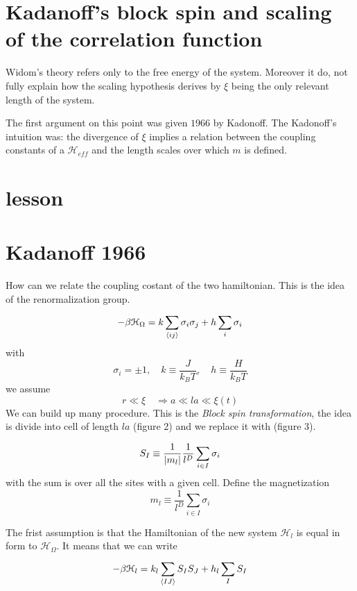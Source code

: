 \documentclass[../main/main.tex]{subfiles}
\begin{document}
\section{Kadanoff's block spin and scaling of the correlation function}
Widom's theory refers only to the free energy of the system. Moreover it do, not fully explain how the scaling hypothesis derives by \( \xi  \) being the only relevant length of the system.

The first argument on this point was given \( 1966 \) by Kadonoff.
The Kadonoff's intuition was: the divergence of \( \xi  \) implies a relation between the coupling constants of a \( \mathcal{H}_{eff} \) and the length scales over which \( m \) is defined.  


\section{lesson}

\section{Kadanoff 1966}
How can we relate the coupling costant of the two hamiltonian. This is the idea of the renormalization group.
\begin{equation}
  - \beta \mathcal{H}_{\Omega } = k \sum_{\expval{ij} }^{} \sigma _i \sigma _j + h \sum_{i}^{} \sigma _i
\end{equation}
with
\begin{equation}
  \sigma _i = \pm 1, \quad k \equiv \frac{J}{k_B T}, \quad h \equiv \frac{H}{k_B T}
\end{equation}
we assume
\begin{equation}
  r \ll \xi  \quad \Rightarrow a \ll l a \ll \xi (t)
\end{equation}
We can build up many procedure.
This is the \emph{Block spin transformation}, the idea is divide into cell of length \( la \) (figure 2) and we replace it with (figure 3).

\begin{equation}
  S_I \equiv \frac{1}{\abs{m_l} } \frac{1}{l^D} \sum_{i \in I}^{}  \sigma _i
\end{equation}
with the sum is over all the sites with a given cell.
Define the magnetization
\begin{equation}
  m_l \equiv \frac{1}{l^D} \sum_{i \in I}^{} \sigma _i
\end{equation}

The frist assumption is that the Hamiltonian of the new system \( \mathcal{H}_l \) is equal in form to \( \mathcal{H}_ \Omega  \). It means that we can write
\begin{equation}
  - \beta \mathcal{H}_l = k_l \sum_{\expval{IJ} }^{} S_I S_J  + h_l \sum_{I}^{} S_I
\end{equation}
\end{document}
